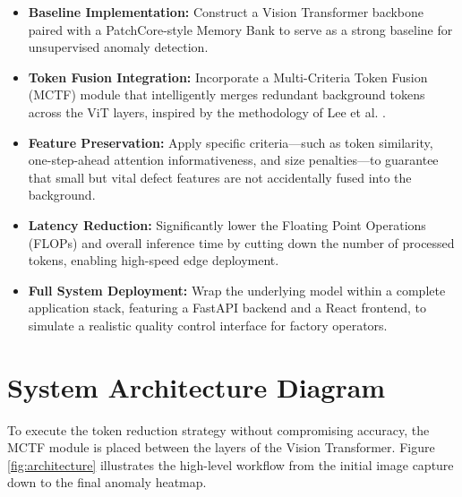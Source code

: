 \documentclass[12pt]{article}
\begin{document}
\begin{itemize}
    \item \textbf{Baseline Implementation:} Construct a Vision Transformer backbone paired with a PatchCore-style Memory Bank to serve as a strong baseline for unsupervised anomaly detection.
    \item \textbf{Token Fusion Integration:} Incorporate a Multi-Criteria Token Fusion (MCTF) module that intelligently merges redundant background tokens across the ViT layers, inspired by the methodology of Lee et al. \cite{lee2023multi}.
    \item \textbf{Feature Preservation:} Apply specific criteria---such as token similarity, one-step-ahead attention informativeness, and size penalties---to guarantee that small but vital defect features are not accidentally fused into the background.
    \item \textbf{Latency Reduction:} Significantly lower the Floating Point Operations (FLOPs) and overall inference time by cutting down the number of processed tokens, enabling high-speed edge deployment.
    \item \textbf{Full System Deployment:} Wrap the underlying model within a complete application stack, featuring a FastAPI backend and a React frontend, to simulate a realistic quality control interface for factory operators.
\end{itemize}

\section{System Architecture Diagram}
To execute the token reduction strategy without compromising accuracy, the MCTF module is placed between the layers of the Vision Transformer. Figure \ref{fig:architecture} illustrates the high-level workflow from the initial image capture down to the final anomaly heatmap.
\end{document}
